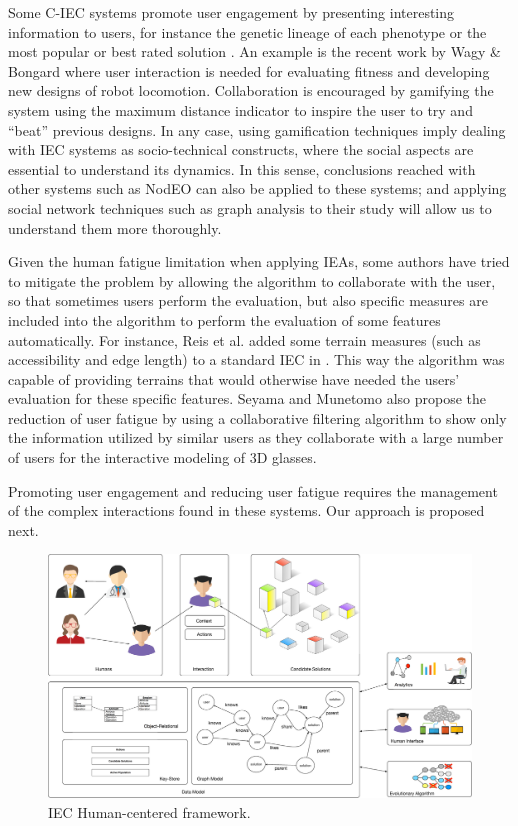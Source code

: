 Some C-IEC systems promote user engagement by presenting interesting information to 
users, for instance the genetic lineage of each phenotype or the most popular or 
best rated solution \cite{picbreeder,forms}. An example is the recent work by 
Wagy \& Bongard \cite{wagy2014collective} where user interaction 
is needed for evaluating fitness and developing
new designs of robot locomotion. Collaboration is encouraged by gamifying the system 
using the maximum distance indicator to inspire the user to try and ``beat'' previous designs. 
In any case, using gamification techniques imply dealing with IEC
systems as socio-technical constructs, where the social aspects are
essential to understand its dynamics. In this sense, conclusions
reached with other systems such as NodEO \cite{DBLP:conf/gecco/MereloCGCRV16}
can also be applied to these systems; and applying social 
network techniques such as graph analysis
to their study will allow us to understand them more thoroughly. 

Given the human fatigue limitation when applying IEAs, some authors 
have tried to mitigate the problem by allowing the algorithm to 
collaborate with the user, so that sometimes 
users perform the evaluation, but also specific measures are included 
into the algorithm to perform the
evaluation of some features automatically. For instance, Reis et al. added
some terrain measures (such as accessibility and edge length) 
to a standard  IEC in \cite{DBLP:journals/soco/FradeVC12}. 
This way the algorithm was capable of providing terrains that would otherwise have needed the
users' evaluation for these specific features. Seyama and Munetomo \cite{seyama2016development}
also propose the reduction of user fatigue by using 
a collaborative filtering algorithm to show only the information utilized by similar users as 
they collaborate with a large number of users for the interactive modeling of 3D glasses. 

Promoting user engagement and reducing user fatigue requires the management of the complex 
interactions found in these systems. Our approach is proposed next.
\begin{figure}[!t]
    \centering
        \includegraphics[width=7in]{img/framework.eps}
    \caption{IEC Human-centered framework.}
    \label{fig:hc_framework}
\end{figure}


